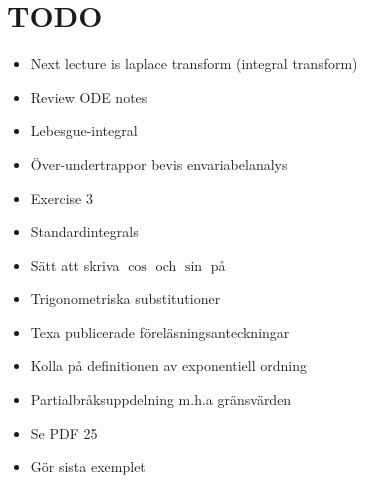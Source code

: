 \section{TODO}\par
\begin{itemize}
  \item Next lecture is laplace transform (integral transform) 
  \item Review ODE notes
  \item Lebesgue-integral
  \item Över-undertrappor bevis envariabelanalys
  \item Exercise 3
  \item Standardintegrals
  \item Sätt att skriva $\cos$ och $\sin$ på
  \item Trigonometriska substitutioner
  \item Texa publicerade föreläsningsanteckningar 
  \item Kolla på definitionen av exponentiell ordning
  \item Partialbråksuppdelning m.h.a gränsvärden
  \item Se PDF 25
  \item Gör sista exemplet
\end{itemize}
